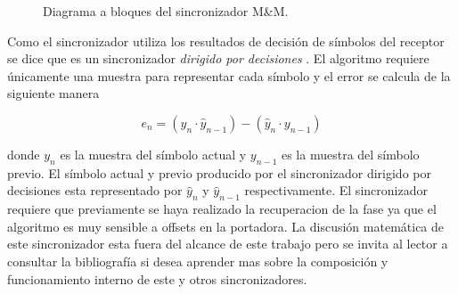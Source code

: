 \begin{figure}[htp]
  \centering
  \vspace{0.5in}
  \vspace{0.3in}
  \caption{Diagrama a bloques del sincronizador M\&M. \protect\cite{meyr}}
  \label{fig:mm}
\end{figure}

Como el sincronizador utiliza los resultados de decisi\'on de s\'imbolos del receptor se dice que es un sincronizador
\emph{dirigido por decisiones} \cite{louis}. El algoritmo requiere \'unicamente una muestra para representar cada s\'imbolo y el
error se calcula de la siguiente manera

\begin{equation}
e_n=(y_n \cdot \hat{y}_{n-1}) - (\hat{y}_n \cdot y_{n-1})
\end{equation}

donde $y_n$ es la muestra del s\'imbolo actual y $y_{n-1}$ es la muestra del s\'imbolo previo. El s\'imbolo actual y previo producido por el sincronizador
dirigido por decisiones esta representado por $\hat{y}_n$ y $\hat{y}_{n-1}$ respectivamente.
El sincronizador requiere que previamente se haya realizado la recuperacion de la fase ya que el algoritmo es muy sensible a offsets en la portadora. La
discusi\'on matem\'atica de este sincronizador esta fuera del alcance de este trabajo pero se invita al lector a consultar la
bibliograf\'ia si desea aprender mas sobre la composici\'on y funcionamiento interno de este y otros sincronizadores. 

